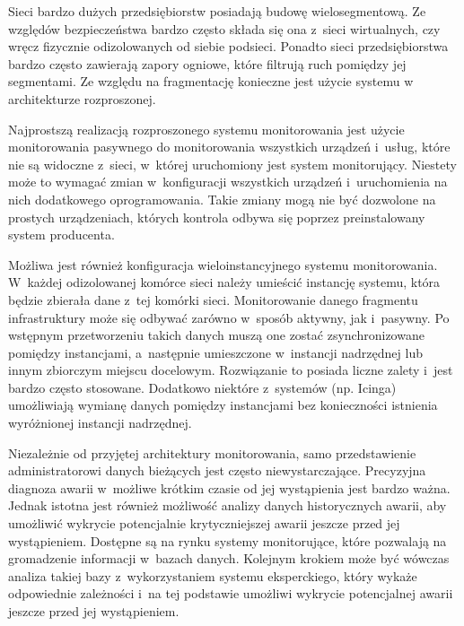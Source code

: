 Sieci bardzo dużych przedsiębiorstw posiadają budowę
wielosegmentową. Ze względów bezpieczeństwa bardzo często składa się
ona z~sieci wirtualnych, czy wręcz fizycznie odizolowanych od siebie
podsieci. Ponadto sieci przedsiębiorstwa bardzo często zawierają
zapory ogniowe, które filtrują ruch pomiędzy jej segmentami. Ze
względu na fragmentację konieczne jest użycie systemu w architekturze
rozproszonej.

Najprostszą realizacją rozproszonego systemu monitorowania jest użycie
monitorowania pasywnego do monitorowania wszystkich urządzeń i~usług,
które nie są widoczne z~sieci, w~której uruchomiony jest system
monitorujący. Niestety może to wymagać zmian w~konfiguracji wszystkich
urządzeń i~uruchomienia na nich dodatkowego oprogramowania. Takie
zmiany mogą nie być dozwolone na prostych urządzeniach, których
kontrola odbywa się poprzez preinstalowany system producenta.

Możliwa jest również konfiguracja wieloinstancyjnego systemu
monitorowania. W~każdej odizolowanej komórce sieci należy umieścić
instancję systemu, która będzie zbierała dane z~tej komórki
sieci. Monitorowanie danego fragmentu infrastruktury może się odbywać
zarówno w~sposób aktywny, jak i~pasywny. Po wstępnym przetworzeniu
takich danych muszą one zostać zsynchronizowane pomiędzy instancjami,
a~następnie umieszczone w~instancji nadrzędnej lub innym zbiorczym
miejscu docelowym. Rozwiązanie to posiada liczne zalety i~jest bardzo
często stosowane. Dodatkowo niektóre z~systemów (np. Icinga)
umożliwiają wymianę danych pomiędzy instancjami bez konieczności
istnienia wyróżnionej instancji nadrzędnej.

Niezależnie od przyjętej architektury monitorowania, samo
przedstawienie administratorowi danych bieżących jest często
niewystarczające. Precyzyjna diagnoza awarii w~możliwe krótkim czasie
od jej wystąpienia jest bardzo ważna. Jednak istotna jest również
możliwość analizy danych historycznych awarii, aby umożliwić wykrycie
potencjalnie krytyczniejszej awarii jeszcze przed jej
wystąpieniem. Dostępne są na rynku systemy monitorujące, które
pozwalają na gromadzenie informacji w~bazach danych. Kolejnym krokiem
może być wówczas analiza takiej bazy z~wykorzystaniem systemu
eksperckiego, który wykaże odpowiednie zależności i~na tej podstawie
umożliwi wykrycie potencjalnej awarii jeszcze przed jej wystąpieniem.

